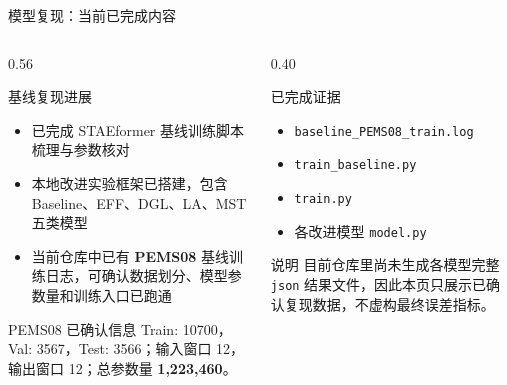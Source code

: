 \documentclass[10pt,aspectratio=169]{ctexbeamer}
\begin{document}
\begin{frame}{模型复现：当前已完成内容}
  \begin{columns}[T]
    \begin{column}{0.56\textwidth}
      \begin{block}{基线复现进展}
        \begin{itemize}\setlength{\itemsep}{2pt}
          \item 已完成 STAEformer 基线训练脚本梳理与参数核对
          \item 本地改进实验框架已搭建，包含 Baseline、EFF、DGL、LA、MST 五类模型
          \item 当前仓库中已有 \textbf{PEMS08} 基线训练日志，可确认数据划分、模型参数量和训练入口已跑通
        \end{itemize}
      \end{block}

      \begin{exampleblock}{PEMS08 已确认信息}
        Train: 10700，Val: 3567，Test: 3566；输入窗口 12，输出窗口 12；总参数量 \textbf{1,223,460}。
      \end{exampleblock}
    \end{column}
    \begin{column}{0.40\textwidth}
      \begin{alertblock}{已完成证据}
        \begin{itemize}\setlength{\itemsep}{2pt}
          \item \texttt{baseline\_PEMS08\_train.log}
          \item \texttt{train\_baseline.py}
          \item \texttt{train.py}
          \item 各改进模型 \texttt{model.py}
        \end{itemize}
      \end{alertblock}

      \begin{block}{说明}
        目前仓库里尚未生成各模型完整 \texttt{json} 结果文件，因此本页只展示已确认复现数据，不虚构最终误差指标。
      \end{block}
    \end{column}
  \end{columns}
\end{frame}
\end{document}
